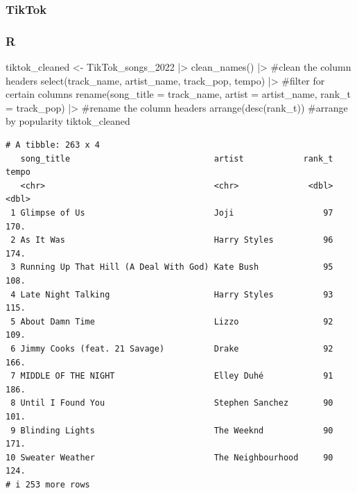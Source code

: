 \documentclass[
  letterpaper,
  DIV=11,
  numbers=noendperiod]{scrreprt}
\newenvironment{Shaded}{\begin{snugshade}}{\end{snugshade}}
\newcommand{\AttributeTok}[1]{\textcolor[rgb]{0.40,0.45,0.13}{#1}}
\newcommand{\CommentTok}[1]{\textcolor[rgb]{0.37,0.37,0.37}{#1}}
\newcommand{\FunctionTok}[1]{\textcolor[rgb]{0.28,0.35,0.67}{#1}}
\newcommand{\NormalTok}[1]{\textcolor[rgb]{0.00,0.23,0.31}{#1}}
\newcommand{\OtherTok}[1]{\textcolor[rgb]{0.00,0.23,0.31}{#1}}
\newcommand{\SpecialCharTok}[1]{\textcolor[rgb]{0.37,0.37,0.37}{#1}}
\begin{document}
\subsubsection*{TikTok}\label{tiktok}

\subsubsection{R}

\begin{Shaded}
\begin{Highlighting}[]
\NormalTok{tiktok\_cleaned }\OtherTok{\textless{}{-}}\NormalTok{ TikTok\_songs\_2022 }\SpecialCharTok{|\textgreater{}}
  \FunctionTok{clean\_names}\NormalTok{() }\SpecialCharTok{|\textgreater{}} \CommentTok{\#clean the column headers}
  \FunctionTok{select}\NormalTok{(track\_name, artist\_name, track\_pop, tempo) }\SpecialCharTok{|\textgreater{}} \CommentTok{\#filter for certain columns}
  \FunctionTok{rename}\NormalTok{(}\AttributeTok{song\_title =}\NormalTok{ track\_name, }\AttributeTok{artist =}\NormalTok{ artist\_name, }\AttributeTok{rank\_t =}\NormalTok{ track\_pop) }\SpecialCharTok{|\textgreater{}} \CommentTok{\#rename the column headers}
  \FunctionTok{arrange}\NormalTok{(}\FunctionTok{desc}\NormalTok{(rank\_t)) }\CommentTok{\#arrange by popularity}
\NormalTok{tiktok\_cleaned}
\end{Highlighting}
\end{Shaded}

\begin{verbatim}
# A tibble: 263 x 4
   song_title                             artist            rank_t tempo
   <chr>                                  <chr>              <dbl> <dbl>
 1 Glimpse of Us                          Joji                  97  170.
 2 As It Was                              Harry Styles          96  174.
 3 Running Up That Hill (A Deal With God) Kate Bush             95  108.
 4 Late Night Talking                     Harry Styles          93  115.
 5 About Damn Time                        Lizzo                 92  109.
 6 Jimmy Cooks (feat. 21 Savage)          Drake                 92  166.
 7 MIDDLE OF THE NIGHT                    Elley Duhé            91  186.
 8 Until I Found You                      Stephen Sanchez       90  101.
 9 Blinding Lights                        The Weeknd            90  171.
10 Sweater Weather                        The Neighbourhood     90  124.
# i 253 more rows
\end{verbatim}
\end{document}
